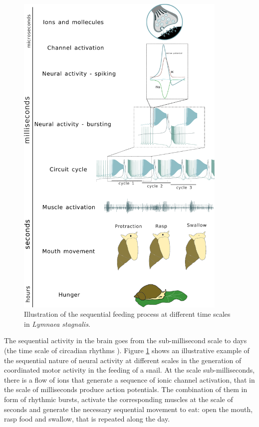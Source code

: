 \begin{figure}[hbt!]
	\centering
	\includegraphics[width=0.9\textwidth]{img/intro/time scale/time-scale-feeding.pdf}
	\caption{Illustration of the sequential feeding process at different time scales in {\sl Lymnaea stagnalis}.}
	\label{fig:time scale feeding}
\end{figure}

The sequential activity in the brain goes from the sub-millisecond scale to days (the time scale of circadian rhythms ). Figure \ref{fig:time scale feeding} shows an illustrative example of the sequential nature of neural activity at different scales in the generation of coordinated motor activity in the feeding of a snail. At the scale sub-milliseconds, there is a flow of ions that generate a sequence of ionic channel activation, that in the scale of milliseconds produce action potentials. The combination of them in form of rhythmic bursts, activate the corresponding muscles at the scale of seconds and generate the necessary sequential movement to eat: open the mouth, rasp food and swallow, that is  repeated along the day. 


